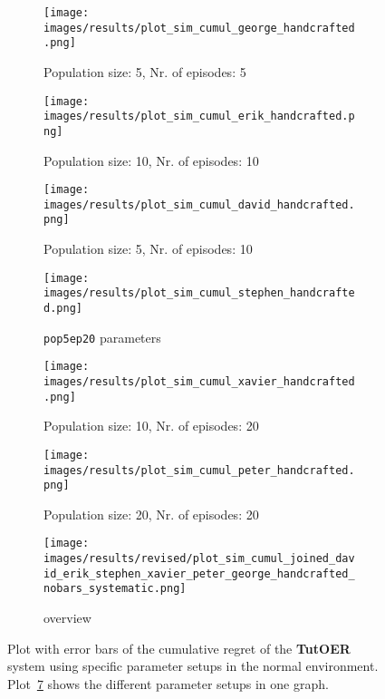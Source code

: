 \begin{figure}[ht]
	\begin{subfigure}{0.48\linewidth}
	\texttt{[image: images/results/plot\_sim\_cumul\_george\_handcrafted.png]}
	\caption{Population size: 5, Nr. of episodes: 5}
	\label{fig:cumul_handcrafted_george}
	\end{subfigure}
	\hfill
	\begin{subfigure}{0.48\linewidth}
	\texttt{[image: images/results/plot\_sim\_cumul\_erik\_handcrafted.png]}
	\caption{Population size: 10, Nr. of episodes: 10}
	\label{fig:cumul_handcrafted_erik}
	\end{subfigure}
	\begin{subfigure}{0.48\linewidth}
	\texttt{[image: images/results/plot\_sim\_cumul\_david\_handcrafted.png]}
	\caption{Population size: 5, Nr. of episodes: 10}
	\label{fig:cumul_handcrafted_david}
	\end{subfigure}
	\hfill
	\begin{subfigure}{0.48\linewidth}
	\texttt{[image: images/results/plot\_sim\_cumul\_stephen\_handcrafted.png]}
	\caption{\texttt{pop5ep20} parameters}
	\label{fig:cumul_handcrafted_stephen}
	\end{subfigure}
	\begin{subfigure}{0.48\linewidth}
	\texttt{[image: images/results/plot\_sim\_cumul\_xavier\_handcrafted.png]}
	\caption{Population size: 10, Nr. of episodes: 20}
	\label{fig:cumul_handcrafted_xavier}
	\end{subfigure}
	\hfill
	\begin{subfigure}{0.48\linewidth}
	\texttt{[image: images/results/plot\_sim\_cumul\_peter\_handcrafted.png]}
	\caption{Population size: 20, Nr. of episodes: 20}
	\label{fig:cumul_handcrafted_peter}
	\end{subfigure}
	\begin{subfigure}{\linewidth}
	\texttt{[image: images/results/revised/plot\_sim\_cumul\_joined\_david\_erik\_stephen\_xavier\_peter\_george\_handcrafted\_nobars\_systematic.png]}
	\caption{overview}
	\label{fig:cumul_handcrafted_overview_group1}
	\end{subfigure}
	\caption[Cumulative regret in normal simulated environment for group 1]{Plot with error bars of the cumulative regret of the \textbf{TutOER}
	system using specific parameter setups in the normal environment.
	Plot~\ref{fig:cumul_handcrafted_overview_group1} shows the
	different parameter setups in one graph.}
	\label{fig:cumul_handcrafted_container_group1}
\end{figure}

